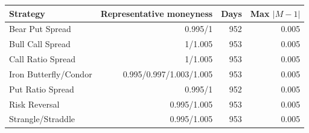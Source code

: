 \begin{tabular}{lrrr}
\toprule
Strategy & Representative moneyness & Days & Max $|M-1|$ \\
\midrule
Bear Put Spread & 0.995/1 & 952 & 0.005 \\
Bull Call Spread & 1/1.005 & 953 & 0.005 \\
Call Ratio Spread & 1/1.005 & 953 & 0.005 \\
Iron Butterfly/Condor & 0.995/0.997/1.003/1.005 & 953 & 0.005 \\
Put Ratio Spread & 0.995/1 & 952 & 0.005 \\
Risk Reversal & 0.995/1.005 & 953 & 0.005 \\
Strangle/Straddle & 0.995/1.005 & 953 & 0.005 \\
\bottomrule
\end{tabular}
